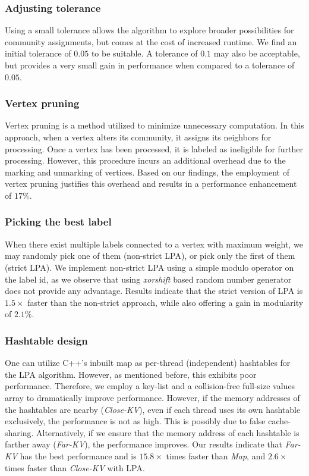 \subsubsection{Adjusting tolerance}

Using a small tolerance allows the algorithm to explore broader possibilities for community assignments, but comes at the cost of increased runtime. We find an initial tolerance of $0.05$ to be suitable. A tolerance of $0.1$ may also be acceptable, but provides a very small gain in performance when compared to a tolerance of $0.05$.


\subsubsection{Vertex pruning}

Vertex pruning is a method utilized to minimize unnecessary computation. In this approach, when a vertex alters its community, it assigns its neighbors for processing. Once a vertex has been processed, it is labeled as ineligible for further processing. However, this procedure incurs an additional overhead due to the marking and unmarking of vertices. Based on our findings, the employment of vertex pruning justifies this overhead and results in a performance enhancement of $17\%$.


\subsubsection{Picking the best label}

When there exist multiple labels connected to a vertex with maximum weight, we may randomly pick one of them (non-strict LPA), or pick only the first of them (strict LPA). We implement non-strict LPA using a simple modulo operator on the label id, as we observe that using \textit{xorshift} based random number generator does not provide any advantage. Results indicate that the strict version of LPA is $1.5\times$ faster than the non-strict approach, while also offering a gain in modularity of $2.1\%$.


\subsubsection{Hashtable design}

One can utilize C++'s inbuilt map as per-thread (independent) hashtables for the LPA algorithm. However, as mentioned before, this exhibits poor performance. Therefore, we employ a key-list and a collision-free full-size values array to dramatically improve performance. However, if the memory addresses of the hashtables are nearby (\textit{Close-KV}), even if each thread uses its own hashtable exclusively, the performance is not as high. This is possibly due to false cache-sharing. Alternatively, if we ensure that the memory address of each hashtable is farther away (\textit{Far-KV}), the performance improves. Our results indicate that \textit{Far-KV} has the best performance and is $15.8\times$ times faster than \textit{Map}, and $2.6\times$ times faster than \textit{Close-KV} with LPA.


